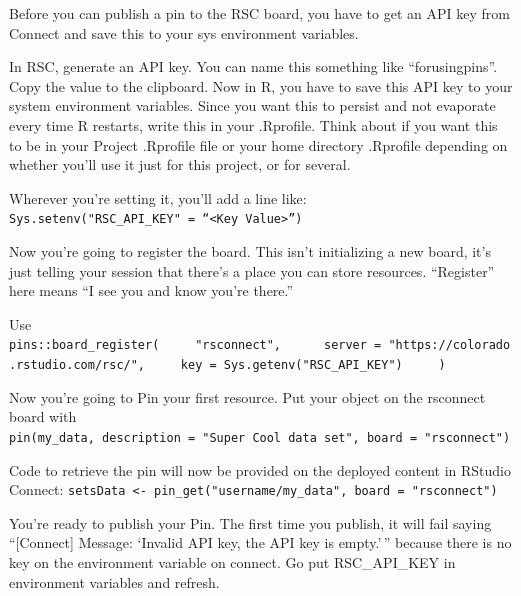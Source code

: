 \documentclass[
]{article}
\begin{document}
Before you can publish a pin to the RSC board, you have to get an API
key from Connect and save this to your sys environment variables.

In RSC, generate an API key. You can name this something like
``forusingpins''. Copy the value to the clipboard. Now in R, you have to
save this API key to your system environment variables. Since you want
this to persist and not evaporate every time R restarts, write this in
your .Rprofile. Think about if you want this to be in your Project
.Rprofile file or your home directory .Rprofile depending on whether
you'll use it just for this project, or for several.

Wherever you're setting it, you'll add a line like:
\texttt{Sys.setenv("RSC\_API\_KEY"\ =\ “\textless{}Key\ Value\textgreater{}”)}

Now you're going to register the board. This isn't initializing a new
board, it's just telling your session that there's a place you can store
resources. ``Register'' here means ``I see you and know you're there.''

Use
\texttt{pins::board\_register(\ \ \ \ \ "rsconnect",\ \ \ \ \ \ server\ =\ "https://colorado.rstudio.com/rsc/",\ \ \ \ \ key\ =\ Sys.getenv("RSC\_API\_KEY")\ \ \ \ \ )}

Now you're going to Pin your first resource. Put your object on the
rsconnect board with
\texttt{pin(my\_data,\ description\ =\ "Super\ Cool\ data\ set",\ board\ =\ "rsconnect")}

Code to retrieve the pin will now be provided on the deployed content in
RStudio Connect:
\texttt{setsData\ \textless{}-\ pin\_get("username/my\_data",\ board\ =\ "rsconnect")}

You're ready to publish your Pin. The first time you publish, it will
fail saying ``{[}Connect{]} Message: `Invalid API key, the API key is
empty.'\,'' because there is no key on the environment variable on
connect. Go put RSC\_API\_KEY in environment variables and refresh.
\end{document}
